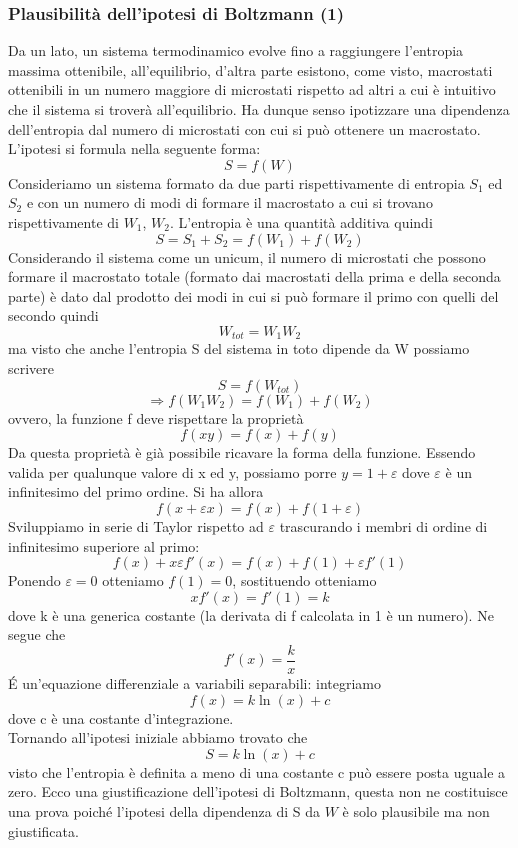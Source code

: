 \documentclass[
10pt, %
a4paper, %
oneside, %
headinclude,footinclude, %
BCOR5mm, %
]{scrartcl}
\begin{document}
\subsubsection*{Plausibilità dell'ipotesi di Boltzmann (1)}
Da un lato, un sistema termodinamico evolve fino a raggiungere l'entropia massima ottenibile, all'equilibrio, d'altra parte esistono, come visto, macrostati ottenibili in un numero maggiore di microstati rispetto ad altri a cui è intuitivo che il sistema si troverà all'equilibrio. Ha dunque senso ipotizzare una dipendenza dell'entropia dal numero di microstati con cui si può ottenere un macrostato. L'ipotesi si formula nella seguente forma:
\[S = f(W)\]
Consideriamo un sistema formato da due parti rispettivamente di entropia \(S_1\) ed \(S_2\) e con un numero di modi di formare il macrostato a cui si trovano rispettivamente di \(W_1\), \(W_2\). L'entropia è una quantità additiva quindi
\[S=S_1+S_2 = f(W_1)+f(W_2)\]
Considerando il sistema come un unicum, il numero di microstati che possono formare il macrostato totale (formato dai macrostati della prima e della seconda parte) è dato dal prodotto dei modi in cui si può formare il primo con quelli del secondo quindi
\[W_{tot}=W_1W_2\]
ma visto che anche l'entropia S del sistema in toto dipende da W possiamo scrivere
\[S=f(W_{tot})\]
\[\Rightarrow f(W_1W_2) = f(W_1)+f(W_2)\]
ovvero, la funzione f deve rispettare la proprietà
\[f(xy)=f(x)+f(y)\]
Da questa proprietà è già possibile ricavare la forma della funzione. Essendo valida per qualunque valore di x ed y, possiamo porre \(y=1+\varepsilon\) dove $\varepsilon$ è un infinitesimo del primo ordine. Si ha allora
\[f(x+\varepsilon x) = f(x)+f(1+\varepsilon)\]
Sviluppiamo in serie di Taylor rispetto ad \(\varepsilon\) trascurando i membri di ordine di infinitesimo superiore al primo:
\[f(x)+x\varepsilon f'(x)=f(x)+f(1)+\varepsilon f'(1)\]
Ponendo \(\varepsilon = 0\) otteniamo \(f(1)=0\), sostituendo otteniamo 
\[x f'(x) = f'(1)=k\]
dove k è una generica costante (la derivata di f calcolata in 1 è un numero). Ne segue che 
\[f'(x)=\frac{k}{x}\]
\'{E} un'equazione differenziale a variabili separabili: integriamo
\[f(x)=k\ln(x)+c\]
dove c è una costante d'integrazione.\\
Tornando all'ipotesi iniziale abbiamo trovato che 
\[S =k\ln(x)+c\]
visto che l'entropia è definita a meno di una costante c può essere posta uguale a zero. Ecco una giustificazione dell'ipotesi di Boltzmann, questa non ne costituisce una prova poiché l'ipotesi della dipendenza di S da \(W\) è solo plausibile ma non giustificata.\\\\
\end{document}

